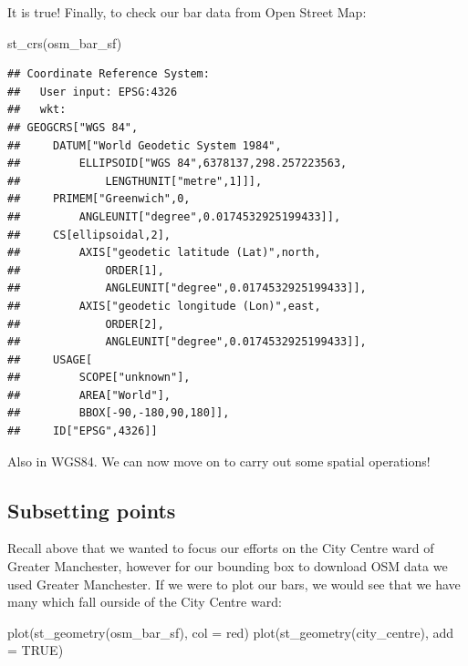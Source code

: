 \documentclass[
]{book}
\newenvironment{Shaded}{\begin{snugshade}}{\end{snugshade}}
\newcommand{\AttributeTok}[1]{\textcolor[rgb]{0.77,0.63,0.00}{#1}}
\newcommand{\ConstantTok}[1]{\textcolor[rgb]{0.00,0.00,0.00}{#1}}
\newcommand{\FunctionTok}[1]{\textcolor[rgb]{0.00,0.00,0.00}{#1}}
\newcommand{\NormalTok}[1]{#1}
\newcommand{\StringTok}[1]{\textcolor[rgb]{0.31,0.60,0.02}{#1}}
\begin{document}
It is true! Finally, to check our bar data from Open Street Map:

\begin{Shaded}
\begin{Highlighting}[]
\FunctionTok{st\_crs}\NormalTok{(osm\_bar\_sf)}
\end{Highlighting}
\end{Shaded}

\begin{verbatim}
## Coordinate Reference System:
##   User input: EPSG:4326 
##   wkt:
## GEOGCRS["WGS 84",
##     DATUM["World Geodetic System 1984",
##         ELLIPSOID["WGS 84",6378137,298.257223563,
##             LENGTHUNIT["metre",1]]],
##     PRIMEM["Greenwich",0,
##         ANGLEUNIT["degree",0.0174532925199433]],
##     CS[ellipsoidal,2],
##         AXIS["geodetic latitude (Lat)",north,
##             ORDER[1],
##             ANGLEUNIT["degree",0.0174532925199433]],
##         AXIS["geodetic longitude (Lon)",east,
##             ORDER[2],
##             ANGLEUNIT["degree",0.0174532925199433]],
##     USAGE[
##         SCOPE["unknown"],
##         AREA["World"],
##         BBOX[-90,-180,90,180]],
##     ID["EPSG",4326]]
\end{verbatim}

Also in WGS84. We can now move on to carry out some spatial operations!

\hypertarget{subsetting-points}{%
\subsection{Subsetting points}\label{subsetting-points}}

Recall above that we wanted to focus our efforts on the City Centre ward of Greater Manchester, however for our bounding box to download OSM data we used Greater Manchester. If we were to plot our bars, we would see that we have many which fall ourside of the City Centre ward:

\begin{Shaded}
\begin{Highlighting}[]
\FunctionTok{plot}\NormalTok{(}\FunctionTok{st\_geometry}\NormalTok{(osm\_bar\_sf), }\AttributeTok{col =} \StringTok{\textquotesingle{}red\textquotesingle{}}\NormalTok{)}
\FunctionTok{plot}\NormalTok{(}\FunctionTok{st\_geometry}\NormalTok{(city\_centre),  }\AttributeTok{add =} \ConstantTok{TRUE}\NormalTok{)}
\end{Highlighting}
\end{Shaded}
\end{document}
